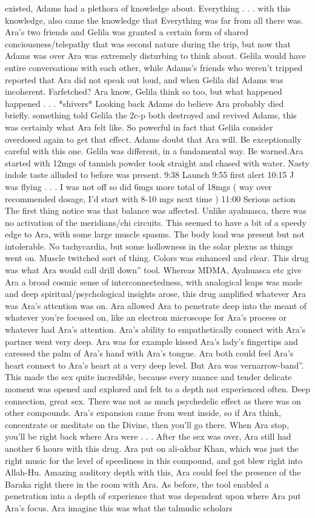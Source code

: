 \documentclass[12pt]{book}
\begin{document}
existed, Adams had a plethora of knowledge about. Everything . . .  with this knowledge, also came the knowledge that Everything was far from all there was. Ara's two friends and Gelila was granted a certain form of shared conciousness/telepathy that was second nature during the trip, but now that Adams was over Ara was extremely disturbing to think about. Gelila would have entire conversations with each other, while Adams's friends who weren't tripped reported that Ara did not speak out loud, and when Gelila did Adams was incoherent. Farfetched? Ara know, Gelila think so too, but what happened happened . . .  *shivers* Looking back Adams do believe Ara probably died briefly. something told Gelila the 2c-p both destroyed and revived Adams, this was certainly what Ara felt like. So powerful in fact that Gelila consider overdosed again to get that effect. Adams doubt that Ara will. Be exceptionally careful with this one. Gelila was different, in a fundamental way. Be warned.Ara started with 12mgs of tannish powder took straight and chased with water. Nasty indole taste alluded to before was present. 9:38 Launch 9:55 first alert 10:15 J was flying . . . I was not off so did 6mgs more total of 18mgs ( way over recommended dosage, I'd start with 8-10 mgs next time ) 11:00 Serious action The first thing notice was that balance was affected. Unlike ayahuasca, there was no activation of the meridians/chi circuits. This seemed to have a bit of a speedy edge to Ara, with some large muscle spasms. The body load was present but not intolerable. No tachycardia, but some hollowness in the solar plexus as things went on. Muscle twitched sort of thing. Colors was enhanced and clear. This drug was what Ara would call drill down'' tool. Whereas MDMA, Ayahuasca etc give Ara a broad cosmic sense of interconnectedness, with analogical leaps was made and deep spiritual/psychological insights arose, this drug amplified whatever Ara was Ara's attention was on. Ara allowed Ara to penetrate deep into the meant of whatever you're focused on, like an electron microscope for Ara's process or whatever had Ara's attention. Ara's ability to empathetically connect with Ara's partner went very deep. Ara was for example kissed Ara's lady's fingertips and caressed the palm of Ara's hand with Ara's tongue. Ara both could feel Ara's heart connect to Ara's heart at a very deep level. But Ara was vernarrow-band''. This made the sex quite incredible, because every nuance and tender delicate moment was opened and explored and felt to a depth not experienced often. Deep connection, great sex. There was not as much psychedelic effect as there was on other compounds. Ara's expansion came from went inside, so if Ara think, concentrate or meditate on the Divine, then you'll go there. When Ara stop, you'll be right back where Ara were . . .  After the sex was over, Ara still had another 6 hours with this drug. Ara put on ali-akbar Khan, which was just the right music for the level of speediness in this compound, and got blew right into Allah-Hu. Amazing auditory depth with this, Ara could feel the presence of the Baraka right there in the room with Ara. As before, the tool enabled a penetration into a depth of experience that was dependent upon where Ara put Ara's focus. Ara imagine this was what the talmudic scholars 
\end{document}
